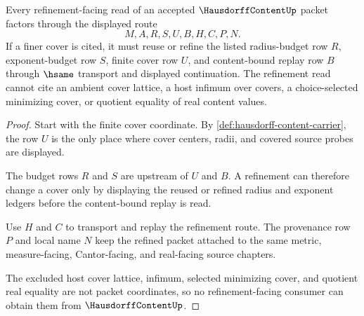 \begin{theorem}
\label{thm:hausdorff-content-finite-cover-refinement}
Every refinement-facing read of an accepted $\HausdorffContentUp$ packet factors through the displayed route
$$
M,A,R,S,U,B,H,C,P,N .
$$
If a finer cover is cited, it must reuse or refine the listed radius-budget row $R$, exponent-budget row $S$, finite cover row $U$, and content-bound replay row $B$ through $\hsame$ transport and displayed continuation. The refinement read cannot cite an ambient cover lattice, a host infimum over covers, a choice-selected minimizing cover, or quotient equality of real content values.
\end{theorem}
\begin{proof}
Start with the finite cover coordinate. By \autoref{def:hausdorff-content-carrier}, the row $U$ is the only place where cover centers, radii, and covered source probes are displayed.

The budget rows $R$ and $S$ are upstream of $U$ and $B$. A refinement can therefore change a cover only by displaying the reused or refined radius and exponent ledgers before the content-bound replay is read.

Use $H$ and $C$ to transport and replay the refinement route. The provenance row $P$ and local name $N$ keep the refined packet attached to the same metric, measure-facing, Cantor-facing, and real-facing source chapters.

The excluded host cover lattice, infimum, selected minimizing cover, and quotient real equality are not packet coordinates, so no refinement-facing consumer can obtain them from $\HausdorffContentUp$.
\end{proof}

